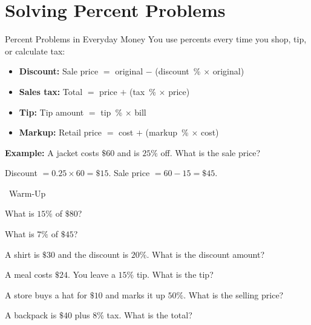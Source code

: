 \section{Solving Percent Problems}

\begin{quickReview}{Percent Problems in Everyday Money}
You use percents every time you shop, tip, or calculate tax:

\begin{itemize}[leftmargin=*]
    \item \textbf{Discount:} Sale price $=$ original $-$ (discount~\% $\times$ original)
    \item \textbf{Sales tax:} Total $=$ price $+$ (tax~\% $\times$ price)
    \item \textbf{Tip:} Tip amount $=$ tip~\% $\times$ bill
    \item \textbf{Markup:} Retail price $=$ cost $+$ (markup~\% $\times$ cost)
\end{itemize}

\medskip
\textbf{Example:} A jacket costs $\$60$ and is $25\%$ off. What is the sale price?

Discount $= 0.25 \times 60 = \$15$. Sale price $= 60 - 15 = \$45$.
\end{quickReview}

\begin{practiceBox}[funGreen]{\faSun~Warm-Up}


\prob What is $15\%$ of $\$80$? \answerBlank[3cm]

\prob What is $7\%$ of $\$45$? \answerBlank[3cm]

\prob A shirt is $\$30$ and the discount is $20\%$. What is the discount amount? \answerBlank[3cm]

\prob A meal costs $\$24$. You leave a $15\%$ tip. What is the tip? \answerBlank[3cm]

\prob A store buys a hat for $\$10$ and marks it up $50\%$. What is the selling price? \answerBlank[3cm]

\prob A backpack is $\$40$ plus $8\%$ tax. What is the total? \answerBlank[3cm]
\end{practiceBox}

